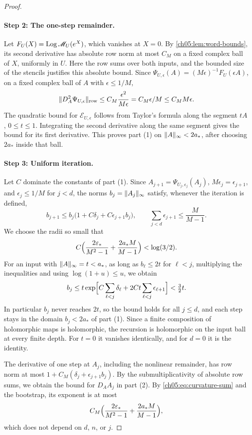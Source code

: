\begin{proof}
\paragraph{Step 2: The one-step remainder.}
Let $F_U(X)=\operatorname{Log}\mathscr M_U(e^X)$, which vanishes at $X=0$. By \cref{ch05:lem:word-bounds}, its second derivative has absolute row norm at most $C_M$ on a fixed complex ball of $X$, uniformly in $U$. Here the row sums over both inputs, and the bounded size of the stencils justifies this absolute bound. Since $\Psi_{U,\epsilon}(A)=(M\epsilon)^{-1}F_U(\epsilon A)$, on a fixed complex ball of $A$ with $\epsilon\le1/M$,
\[
 \lVert D_A^2\Psi_{U,\epsilon}\rVert_{\mathrm{row}}\le C_M\frac{\epsilon^2}{M\epsilon}=C_M\epsilon/M\le C_MM\epsilon.
\]
The quadratic bound for $\mathscr E_{U,\epsilon}$ follows from Taylor's formula along the segment $tA$, $0\le t\le1$. Integrating the second derivative along the same segment gives the bound for its first derivative. This proves part (1) on $\lVert A\rVert_\infty<2a_*$, after choosing $2a_*$ inside that ball.

\paragraph{Step 3: Uniform iteration.}
Let $C$ dominate the constants of part (1). Since $A_{j+1}=\Psi_{U_j,\epsilon_j}(A_j)$, $M\epsilon_j=\epsilon_{j+1}$, and $\epsilon_j\le1/M$ for $j<d$, the norms $b_j=\lVert A_j\rVert_\infty$ satisfy, whenever the iteration is defined,
\[
 b_{j+1}\le b_j\bigl(1+C\delta_j+C\epsilon_{j+1}b_j\bigr),\qquad\sum_{j<d}\epsilon_{j+1}\le\frac M{M-1}.
\]
We choose the radii so small that
\begin{equation}\label{ch05:eq:bootstrap-choice}
 C\Bigl(\frac{2\varepsilon_*}{M^2-1}+\frac{2a_*M}{M-1}\Bigr)<\log(3/2).
\end{equation}
For an input with $\lVert A\rVert_\infty=t<a_*$, as long as $b_\ell\le2t$ for $\ell<j$, multiplying the inequalities and using $\log(1+u)\le u$, we obtain
\[
 b_j\le t\exp\Bigl[C\sum_{\ell<j}\delta_\ell+2Ct\sum_{\ell<j}\epsilon_{\ell+1}\Bigr]<\tfrac32t.
\]
In particular $b_j$ never reaches $2t$, so the bound holds for all $j\le d$, and each step stays in the domain $b_j<2a_*$ of part (1). Since a finite composition of holomorphic maps is holomorphic, the recursion is holomorphic on the input ball at every finite depth. For $t=0$ it vanishes identically, and for $d=0$ it is the identity.

The derivative of one step at $A_j$, including the nonlinear remainder, has row norm at most $1+C_M(\delta_j+\epsilon_{j+1}b_j)$. By the submultiplicativity of absolute row sums, we obtain the bound for $D_AA_j$ in part (2). By \eqref{ch05:eq:curvature-sum} and the bootstrap, its exponent is at most
\[
 C_M\Bigl(\frac{2\varepsilon_*}{M^2-1}+\frac{2a_*M}{M-1}\Bigr),
\]
which does not depend on $d$, $n$, or $j$.


\end{proof}
